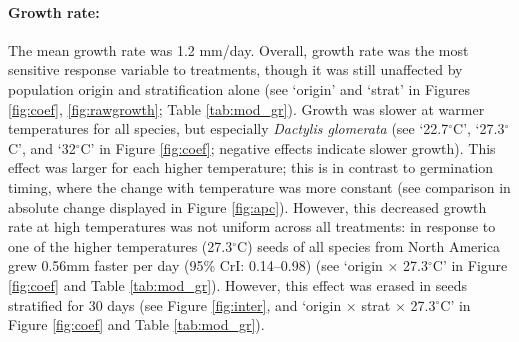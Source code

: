 \documentclass[11pt]{article}\usepackage[]{graphicx}\usepackage[]{color}
\begin{document}
	\paragraph{Growth rate:} The mean growth rate was 1.2 mm/day. Overall, growth rate was the most sensitive response variable to treatments, though it was still unaffected by population origin and stratification alone  (see `origin' and `strat' in Figures \ref{fig:coef}, \ref{fig:rawgrowth}; Table \ref{tab:mod_gr}). Growth was slower at warmer temperatures for all species, but especially \textit{Dactylis glomerata} (see `22.7$^{\circ}$C', `27.3$^{\circ}$C', and `32$^{\circ}$C' in Figure \ref{fig:coef}; negative effects indicate slower growth). This effect was larger for each higher temperature; this is in contrast to germination timing, where the change with temperature was more constant (see comparison in absolute change displayed in Figure \ref{fig:apc}). However, this decreased growth rate at high temperatures was not uniform across all treatments: in response to one of the higher temperatures (27.3$^{\circ}$C) seeds of all species from North America grew 0.56mm faster per day (95\% CrI: 0.14--0.98) (see `origin $\times$ 27.3$^{\circ}$C' in Figure \ref{fig:coef} and Table \ref{tab:mod_gr}). However, this effect was erased in seeds stratified for 30 days %
	(see Figure \ref{fig:inter}, and `origin $\times$ strat $\times$ 27.3$^{\circ}$C' in Figure \ref{fig:coef} and Table \ref{tab:mod_gr}). 
	

\end{document}
